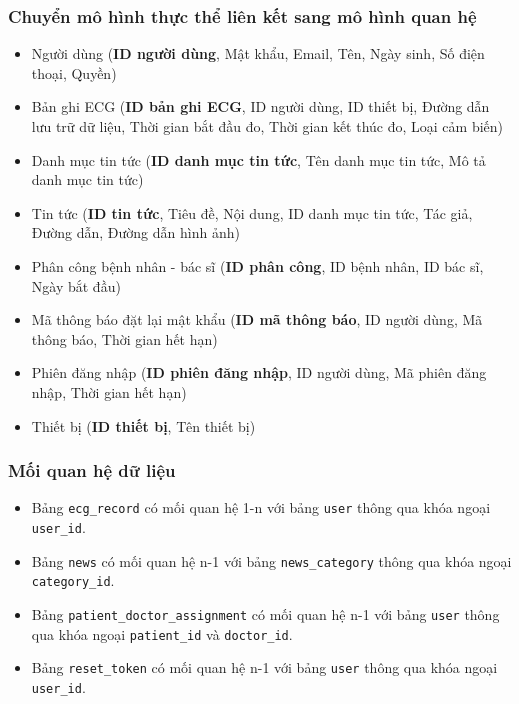 \subsubsection{Chuyển mô hình thực thể liên kết sang mô hình quan hệ}

\begin{itemize}
  \item Người dùng (\textbf{ID người dùng}, Mật khẩu, Email, Tên, Ngày sinh, Số điện thoại, Quyền)
  \item Bản ghi ECG (\textbf{ID bản ghi ECG}, ID người dùng, ID thiết bị, Đường dẫn lưu trữ dữ liệu, Thời gian bắt đầu đo, Thời gian kết thúc đo, Loại cảm biến)
  \item Danh mục tin tức (\textbf{ID danh mục tin tức}, Tên danh mục tin tức, Mô tả danh mục tin tức)
  \item Tin tức (\textbf{ID tin tức}, Tiêu đề, Nội dung, ID danh mục tin tức, Tác giả, Đường dẫn, Đường dẫn hình ảnh)
  \item Phân công bệnh nhân - bác sĩ (\textbf{ID phân công}, ID bệnh nhân, ID bác sĩ, Ngày bắt đầu)
  \item Mã thông báo đặt lại mật khẩu (\textbf{ID mã thông báo}, ID người dùng, Mã thông báo, Thời gian hết hạn)
  \item Phiên đăng nhập (\textbf{ID phiên đăng nhập}, ID người dùng, Mã phiên đăng nhập, Thời gian hết hạn)
  \item Thiết bị (\textbf{ID thiết bị}, Tên thiết bị)
\end{itemize}



\subsubsection{Mối quan hệ dữ liệu}

\begin{itemize}
  \item Bảng \texttt{ecg\_record} có mối quan hệ 1-n với bảng \texttt{user} thông qua khóa ngoại \texttt{user\_id}.
  \item Bảng \texttt{news} có mối quan hệ n-1 với bảng \texttt{news\_category} thông qua khóa ngoại \texttt{category\_id}.
  \item Bảng \texttt{patient\_doctor\_assignment} có mối quan hệ n-1 với bảng \texttt{user} thông qua khóa ngoại \texttt{patient\_id} và \texttt{doctor\_id}.
  \item Bảng \texttt{reset\_token} có mối quan hệ n-1 với bảng \texttt{user} thông qua khóa ngoại \texttt{user\_id}.
\end{itemize}

